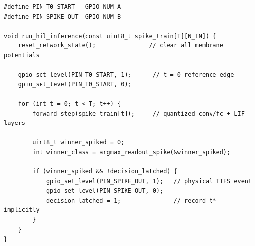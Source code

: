 \begin{lstlisting}[caption={GPIO-instrumented inference loop for the Hardware-in-the-Loop protocol (Section~\ref{sec:measurement-protocol}).}, label={lst:gpio-loop}]
#define PIN_T0_START   GPIO_NUM_A
#define PIN_SPIKE_OUT  GPIO_NUM_B

void run_hil_inference(const uint8_t spike_train[T][N_IN]) {
    reset_network_state();               // clear all membrane potentials

    gpio_set_level(PIN_T0_START, 1);      // t = 0 reference edge
    gpio_set_level(PIN_T0_START, 0);

    for (int t = 0; t < T; t++) {
        forward_step(spike_train[t]);     // quantized conv/fc + LIF layers

        uint8_t winner_spiked = 0;
        int winner_class = argmax_readout_spike(&winner_spiked);

        if (winner_spiked && !decision_latched) {
            gpio_set_level(PIN_SPIKE_OUT, 1);   // physical TTFS event
            gpio_set_level(PIN_SPIKE_OUT, 0);
            decision_latched = 1;               // record t* implicitly
        }
    }
}
\end{lstlisting}

